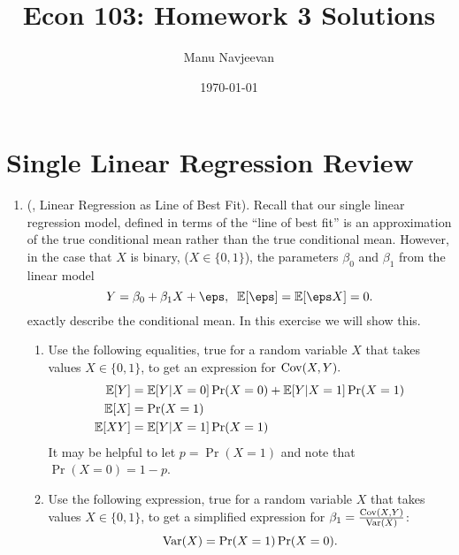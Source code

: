\documentclass[10pt]{article}
\title{Econ 103: Homework 3 Solutions}%
\author{Manu Navjeevan}
\date{\today}
\begin{document}
\maketitle

\section*{Single Linear Regression Review}%
\begin{enumerate}
	\item (, Linear Regression as Line of Best Fit). Recall that our single linear regression model, defined in terms of the ``line of best fit'' is an approximation of the true conditional mean rather than the true conditional mean. However, in the case that \(X\) is binary, (\(X \in \{0,1\}\)), the parameters  \(\beta_0\) and  \(\beta_1\) from the linear model
	\[
		Y = \beta_0 + \beta_1X + \eps,\;\;\E[\eps] = \E[\eps X] = 0
	.\] 
	exactly describe the conditional mean. In this exercise we will show this. 	
	\begin{enumerate}
		\item Use the following equalities, true for a random variable \(X\) that takes values  \(X\in \{0,1\}\), to get an expression for \(\operatorname{Cov}(X,Y).\)
		\begin{align*}
			\mathbb{E}[Y] &= \mathbb{E}[Y|X=0]\Pr(X=0) + \mathbb{E}[Y|X=1]\Pr(X=1)\\
			\mathbb{E}[X] &= \Pr(X=1) \\
			\mathbb{E}[XY] &= \mathbb{E}[Y|X=1]\Pr(X=1)
		\end{align*}
		It may be helpful to let \(p = \Pr(X=1)\) and note that  \(\Pr(X=0) = 1-p\).

		 
		\item Use the following expression, true for a random variable \(X\) that takes values  \(X\in \{0,1\}\), to get a simplified expression for \(\beta_1 = \frac{\operatorname{Cov}(X,Y)}{\operatorname{Var}(X)}\):
		\[
			\operatorname{Var}(X) = \Pr(X=1)\Pr(X=0) 
		 .\] 


\end{enumerate}
\end{enumerate}
\end{document}
